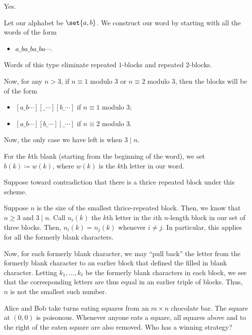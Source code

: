\documentclass[10pt]{mypackage}
\begin{document}
\begin{solution}
  Yes.\newline

  Let our alphabet be $\set{a,b}$. We construct our word by starting with all the words of the form
  \begin{itemize}
    \item $a\_ba\_ba\_ba\cdots$.
  \end{itemize}
  Words of this type eliminate repeated $1$-blocks and repeated $2$-blocks.\newline

  Now, for any $n > 3$, if $n\equiv 1$ modulo $3$ or $n\equiv 2$ modulo $3$, then the blocks will be of the form
  \begin{itemize}
    \item $\left[ a\_b\cdots \right]\left[ \_\cdots \right]\left[ b\_\cdots \right]$ if $n\equiv 1$ modulo $3$;
    \item $\left[ a\_b\cdots \right]\left[ b\_\cdots \right]\left[ \_\cdots \right]$ if $n\equiv 2$ modulo $3$.
  \end{itemize}
  Now, the only case we have left is when $3 \mid n$.\newline

  For the $k$th blank (starting from the beginning of the word), we set $b(k) \coloneq w(k)$, where $w(k)$ is the $k$th letter in our word.\newline

  Suppose toward contradiction that there is a thrice repeated block under this scheme.\newline

  Suppose $n$ is the size of the smallest thrice-repeated block. Then, we know that $n\geq 3$ and $3 \mid n$. Call $n_i(k)$ the $k$th letter in the $i$th $n$-length block in our set of three blocks. Then, $n_i(k) = n_j(k)$ whenever $i\neq j$. In particular, this applies for all the formerly blank characters.\newline

  Now, for each formerly blank character, we may ``pull back'' the letter from the formerly blank character to an earlier block that defined the filled in blank character. Letting $k_1,\dots,k_\ell$ be the formerly blank characters in each block, we see that the corresponding letters are thus equal in an earlier triple of blocks. Thus, $n$ is not the smallest such number.
\end{solution}
\begin{problem}
  Alice and Bob take turns eating squares from an $m\times n$ chocolate bar. The square at $(0,0)$ is poisonous. Whenever anyone eats a square, all squares above and to the right of the eaten square are also removed. Who has a winning strategy?
\end{problem}
\end{document}
